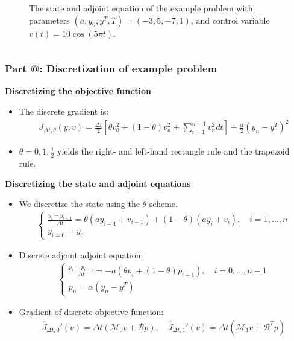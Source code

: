\documentclass[9pt]{beamer}
\makeatletter
\newcommand*{\rom}[1]{\expandafter\@slowromancap\romannumeral #1@}
\makeatother
\begin{document}
\begin{frame}
\begin{columns}
\begin{figure}
\caption{{\tiny The state and adjoint equation of the example problem with parameters $(a,y_0,y^T,T)=(-3,5,-7,1)$, and control variable $v(t)=10\cos(5\pi t)$.}}
\end{figure}
\end{columns}
\end{frame}

\begin{frame}
\frametitle{\textbf{ Part \rom{3}:} Discretization of example problem}
\textbf{Discretizing the objective function}
\begin{itemize}
\item{The discrete gradient is:{\small\begin{align*}
J_{\Delta t,\theta}(y,v) = \frac{\Delta t}{2}[\theta v_0^2 +(1-\theta)v_n^2+\sum_{i=1}^{n-1}v_n^2dt] + \frac{\alpha}{2}(y_n-y^T)^2
\end{align*}
}}
\item{$\theta=0,1,\frac{1}{2}$ yields the right- and left-hand rectangle rule and the trapezoid rule.}
\end{itemize}
\textbf{Discretizing the state and adjoint equations}
\begin{itemize}
\item{We discretize the state using the $\theta$ scheme.
{\small\begin{align*}
\left\{
     \begin{array}{lr}
	\frac{y_i-y_{i-1}}{\Delta t} = \theta(ay_{i-1} +v_{i-1})+(1-\theta)(ay_i +v_i),\quad i=1,...,n\\
	y_{i=0}=y_0
	\end{array}
   \right. 
\end{align*}
}}
\item{Discrete adjoint adjoint equation:{\small\begin{align*}
\left\{
     \begin{array}{lr}
	\frac{p_i-p_{i-1}}{\Delta t} = -a(\theta p_i+(1-\theta)p_{i-1}),\quad i=0,...,n-1\\
	p_{n}=\alpha(y_n-y^T)
	\end{array}
   \right.
\end{align*}}}
\item<2>{Gradient of discrete objective function:
{\small\begin{align*}
\hat J_{\Delta t,0}'(v) = \Delta t(\mathcal{M}_{0}v+\mathcal{B} p),\quad \hat J_{\Delta t,1}'(v) = \Delta t(\mathcal{M}_{1}v+\mathcal{B}^T p)

\end{align*}}}
\end{itemize}
\end{frame}
\end{document}
